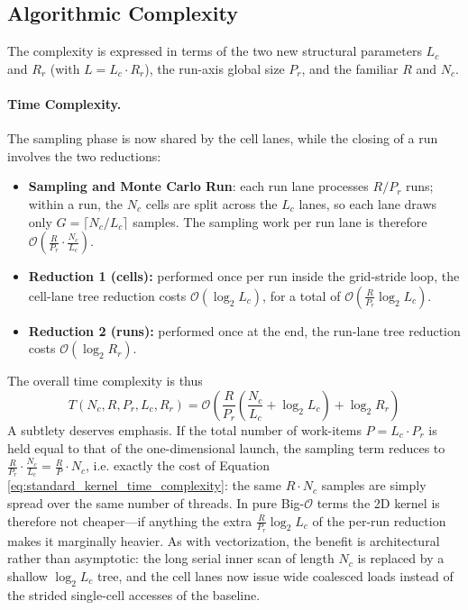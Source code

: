 \subsection{Algorithmic Complexity}\label{subsec:2d_complexity}
The complexity is expressed in terms of the two new structural parameters $L_c$ and $R_r$ (with $L = L_c \cdot R_r$), the run-axis global size $P_r$, and the familiar $R$ and $N_c$.

\paragraph{Time Complexity.}
The sampling phase is now shared by the cell lanes, while the closing of a run involves the two reductions:
\begin{itemize}
    \item \textbf{Sampling and Monte Carlo Run}: each run lane processes $R / P_r$ runs; within a run, the $N_c$ cells are split across the $L_c$ lanes, so each lane draws only $G = \lceil N_c / L_c \rceil$ samples. The sampling work per run lane is therefore $\mathcal{O}\!\left(\frac{R}{P_r}\cdot\frac{N_c}{L_c}\right)$.
    \item \textbf{Reduction 1 (cells):} performed once per run inside the grid-stride loop, the cell-lane tree reduction costs $\mathcal{O}(\log_2 L_c)$, for a total of $\mathcal{O}\!\left(\frac{R}{P_r}\log_2 L_c\right)$.
    \item \textbf{Reduction 2 (runs):} performed once at the end, the run-lane tree reduction costs $\mathcal{O}(\log_2 R_r)$.
\end{itemize}
\noindent
The overall time complexity is thus
\begin{equation}
    T(N_c, R, P_r, L_c, R_r) = \mathcal{O}\!\left(\frac{R}{P_r}\left(\frac{N_c}{L_c} + \log_2 L_c\right) + \log_2 R_r\right)
\label{eq:2d_kernel_time_complexity}
\end{equation}
A subtlety deserves emphasis. If the total number of work-items $P = L_c \cdot P_r$ is held equal to that of the one-dimensional launch, the sampling term reduces to $\frac{R}{P_r}\cdot\frac{N_c}{L_c} = \frac{R}{P}\cdot N_c$, i.e. exactly the cost of Equation \ref{eq:standard_kernel_time_complexity}: the same $R \cdot N_c$ samples are simply spread over the same number of threads. In pure Big-$\mathcal{O}$ terms the 2D kernel is therefore not cheaper---if anything the extra $\frac{R}{P_r}\log_2 L_c$ of the per-run reduction makes it marginally heavier. As with vectorization, the benefit is architectural rather than asymptotic: the long serial inner scan of length $N_c$ is replaced by a shallow $\log_2 L_c$ tree, and the cell lanes now issue wide coalesced loads instead of the strided single-cell accesses of the baseline.

